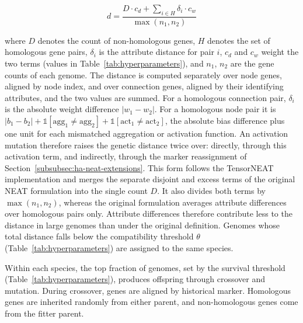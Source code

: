 \documentclass[12pt]{article}
\begin{document}
\[d = \frac{D \cdot c_d + \sum_{i \in H} \delta_i \cdot c_w}{\max(n_1, n_2)}\]

where $D$ denotes the count of non-homologous genes, $H$ denotes the set of homologous gene pairs, $\delta_i$ is the attribute distance for pair $i$, $c_d$ and $c_w$ weight the two terms (values in Table~\ref{tab:hyperparameters}), and $n_1$, $n_2$ are the gene counts of each genome.
The distance is computed separately over node genes, aligned by node index, and over connection genes, aligned by their identifying attributes, and the two values are summed.
For a homologous connection pair, $\delta_i$ is the absolute weight difference $|w_1 - w_2|$.
For a homologous node pair it is $|b_1 - b_2| + \mathbb{1}[\text{agg}_1 \neq \text{agg}_2] + \mathbb{1}[\text{act}_1 \neq \text{act}_2]$, the absolute bias difference plus one unit for each mismatched aggregation or activation function.
An activation mutation therefore raises the genetic distance twice over: directly, through this activation term, and indirectly, through the marker reassignment of Section~\ref{subsubsec:ha-neat-extensions}.
This form follows the TensorNEAT \parencite{wang_tensorized_2024} implementation and merges the separate disjoint and excess terms of the original NEAT formulation into the single count $D$.
It also divides both terms by $\max(n_1, n_2)$, whereas the original formulation averages attribute differences over homologous pairs only. Attribute differences therefore contribute less to the distance in large genomes than under the original definition.
Genomes whose total distance falls below the compatibility threshold $\theta$ (Table~\ref{tab:hyperparameters}) are assigned to the same species.

Within each species, the top fraction of genomes, set by the survival threshold (Table~\ref{tab:hyperparameters}), produces offspring through crossover and mutation.
During crossover, genes are aligned by historical marker. Homologous genes are inherited randomly from either parent, and non-homologous genes come from the fitter parent.


\end{document}
